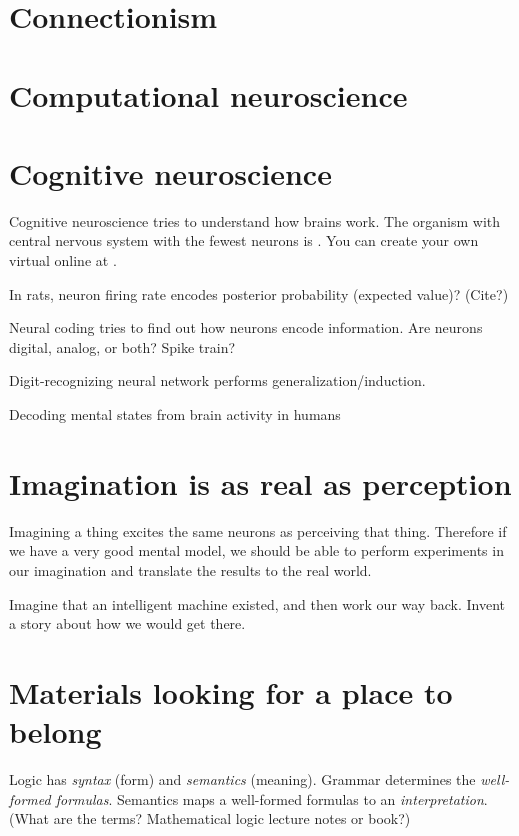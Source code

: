\section{Connectionism}

\section{Computational neuroscience}

\section{Cognitive neuroscience}

Cognitive neuroscience tries to understand how brains work.
The organism with central nervous system with the fewest neurons is .
You can create your own virtual  online at \cite{openworm}.

In rats, neuron firing rate encodes posterior probability (expected value)?
(Cite?)

Neural coding tries to find out how neurons encode information.
Are neurons digital, analog, or both?
Spike train?

Digit-recognizing neural network performs generalization/induction.

Decoding mental states from brain activity in humans \cite{haynes2006decoding}

\section{Imagination is as real as perception}

Imagining a thing excites the same neurons as perceiving that thing.
Therefore if we have a very good mental model,
we should be able to perform experiments in our imagination
and translate the results to the real world.

Imagine that an intelligent machine existed,
and then work our way back.
Invent a story about how we would get there.

\section{Materials looking for a place to belong}

Logic has \emph{syntax} (form) and \emph{semantics} (meaning).
Grammar determines the \emph{well-formed formulas}.
Semantics maps a well-formed formulas to an \emph{interpretation}.
(What are the terms? Mathematical logic lecture notes or book?)

